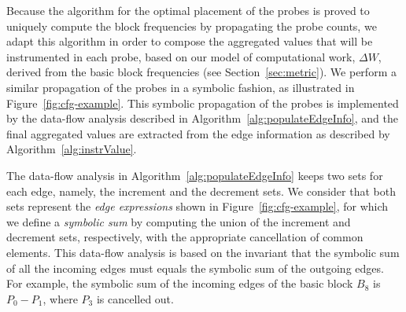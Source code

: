 \documentclass[sigplan,9pt]{acmart}
\begin{document}
Because the algorithm for the optimal placement of the probes is proved to uniquely compute the block frequencies by propagating the probe counts, we adapt this algorithm in order to compose the aggregated values that will be instrumented in each probe, based on our model of computational work, $\Delta W$, derived from the basic block frequencies (see Section~\ref{sec:metric}).
We perform a similar propagation of the probes in a symbolic fashion, as illustrated in Figure~\ref{fig:cfg-example}.
This symbolic propagation of the probes is implemented by the data-flow analysis described in Algorithm~\ref{alg:populateEdgeInfo}, and the final aggregated values are extracted from the edge information as described by Algorithm~\ref{alg:instrValue}.

The data-flow analysis in Algorithm~\ref{alg:populateEdgeInfo} keeps two sets for each edge, namely, the increment and the decrement sets.
We consider that both sets represent the \textit{edge expressions} shown in Figure~\ref{fig:cfg-example}, for which we define a \textit{symbolic sum} by computing the union of the increment and decrement sets, respectively, with the appropriate cancellation of common elements.
This data-flow analysis is based on the invariant that the symbolic sum of all the incoming edges must equals the symbolic sum of the outgoing edges.
For example, the symbolic sum of the incoming edges of the basic block $B_8$ is $P_0 - P_1$, where $P_3$ is cancelled out.

\end{document}
